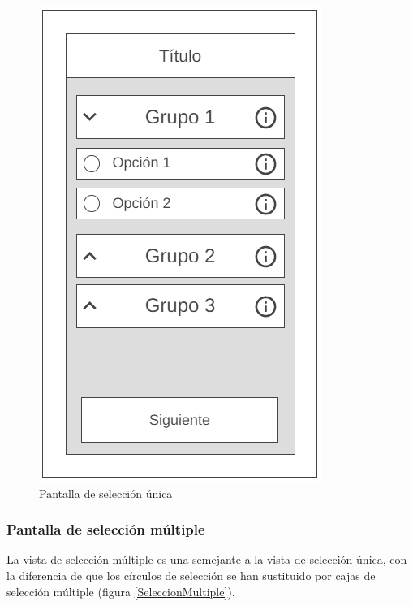 \begin{figure}[H]
    \centering
    \includegraphics[scale=0.3]{Figures/Mockups/Mock_SeleccionUnicaGrupos.png}
    \caption{Pantalla de selección única}
    \label{SeleccionUnicaGrupos}    
\end{figure}

\subsubsection{Pantalla de selección múltiple}
La vista de selección múltiple es una semejante a la vista de selección única, con la diferencia de que los círculos de selección 
se han sustituido por cajas de selección múltiple (figura \ref*{SeleccionMultiple}).

